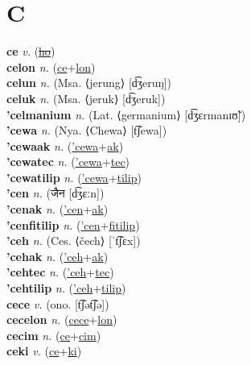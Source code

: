 \section{C}

\textbf{ce} \textit{v.} (\hyperref[ho]{\sout{ho}})
 \label{ce} \\
\textbf{celon} \textit{n.} (\hyperref[ce]{ce}+\hyperref[lon]{lon})
 \label{celon} \\
\textbf{celun} \textit{n.} (Msa. ⟨jerung⟩ [d͡ʒeruŋ])
 \label{celun} \\
\textbf{celuk} \textit{n.} (Msa. ⟨jeruk⟩ [d͡ʒeruk])
 \label{celuk} \\
\textbf{'celmanium} \textit{n.} (Lat. ⟨germanium⟩ [d͡ʒɛrmanɪʊ̃])
 \label{'celmanium} \\
\textbf{'cewa} \textit{n.} (Nya. ⟨Chewa⟩ [t͡ʃewa])
 \label{'cewa} \\
\textbf{'cewaak} \textit{n.} (\hyperref['cewa]{'cewa}+\hyperref[ak]{ak})
 \label{'cewaak} \\
\textbf{'cewatec} \textit{n.} (\hyperref['cewa]{'cewa}+\hyperref[tec]{tec})
 \label{'cewatec} \\
\textbf{'cewatilip} \textit{n.} (\hyperref['cewa]{'cewa}+\hyperref[tilip]{tilip})
 \label{'cewatilip} \\
\textbf{'cen} \textit{n.} ({\devanagari{}जैन} [d͡ʒɛːn])
 \label{'cen} \\
\textbf{'cenak} \textit{n.} (\hyperref['cen]{'cen}+\hyperref[ak]{ak})
 \label{'cenak} \\
\textbf{'cenfitilip} \textit{n.} (\hyperref['cen]{'cen}+\hyperref[fitilip]{fitilip})
 \label{'cenfitilip} \\
\textbf{'ceh} \textit{n.} (Ces. ⟨čech⟩ [ˈt͡ʃɛx])
 \label{'ceh} \\
\textbf{'cehak} \textit{n.} (\hyperref['ceh]{'ceh}+\hyperref[ak]{ak})
 \label{'cehak} \\
\textbf{'cehtec} \textit{n.} (\hyperref['ceh]{'ceh}+\hyperref[tec]{tec})
 \label{'cehtec} \\
\textbf{'cehtilip} \textit{n.} (\hyperref['ceh]{'ceh}+\hyperref[tilip]{tilip})
 \label{'cehtilip} \\
\textbf{cece} \textit{v.} (ono. [t͡ʃət͡ʃə])
 \label{cece} \\
\textbf{cecelon} \textit{n.} (\hyperref[cece]{cece}+\hyperref[lon]{lon})
 \label{cecelon} \\
\textbf{cecim} \textit{n.} (\hyperref[ce]{ce}+\hyperref[cim]{cim})
 \label{cecim} \\
\textbf{ceki} \textit{v.} (\hyperref[ce]{ce}+\hyperref[ki]{ki})
